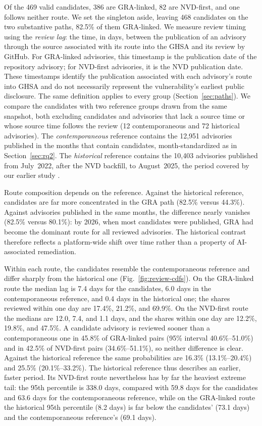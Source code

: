 \documentclass[smallextended,natbib]{svjour3}
\begin{document}
Of the 469 valid candidates, 386 are GRA-linked, 82 are NVD-first, and one follows neither route. We set the singleton aside, leaving 468 candidates on the two substantive paths, 82.5\% of them GRA-linked. We measure review timing using the \emph{review lag}: the time, in days, between the publication of an advisory through the source associated with its route into the GHSA and its review by GitHub. For GRA-linked advisories, this timestamp is the publication date of the repository advisory; for NVD-first advisories, it is the NVD publication date. These timestamps identify the publication associated with each advisory's route into GHSA and do not necessarily represent the vulnerability's earliest public disclosure. The same definition applies to every group (Section~\ref{sec:paths}).   We compare the candidates
with two reference groups drawn from the same snapshot, both excluding
candidates and advisories that lack a source time or whose source time follows
the review (12 contemporaneous and 72 historical advisories).  The
\emph{contemporaneous} reference contains the 12{,}951 advisories published in
the months that contain candidates, month-standardized as in
Section~\ref{sec:rq2}.  The \emph{historical} reference contains the 10{,}403
advisories published from July~2022, after the NVD backfill, to August~2025,
the period covered by our earlier study \citep{segal2026ghsa}.

Route composition depends on the reference.  Against the historical
reference, candidates are far more concentrated in the GRA path (82.5\% versus
44.3\%).  Against advisories published in the same months, the difference
nearly vanishes (82.5\% versus 80.1\%): by 2026, when most candidates were
published, GRA had become the dominant route for all reviewed advisories.  The
historical contrast therefore reflects a platform-wide shift over time rather
than a property of AI-associated remediation.

Within each route, the candidates resemble the contemporaneous reference and
differ sharply from the historical one (Fig.~\ref{fig:review-cdfs}).  On the
GRA-linked route the median lag is 7.4 days for the candidates, 6.0 days in the
contemporaneous reference, and 0.4 days in the historical one; the shares
reviewed within one day are 17.4\%, 21.2\%, and 69.9\%.  On the NVD-first route
the medians are 12.0, 7.4, and 1.1 days, and the shares within one day are
12.2\%, 19.8\%, and 47.5\%.  A candidate advisory is reviewed sooner than a
contemporaneous one in 45.8\% of GRA-linked pairs (95\% interval
40.6\%--51.0\%) and in 42.5\% of NVD-first pairs (34.6\%--51.1\%), so neither
difference is clear.  Against the historical reference the same probabilities
are 16.3\% (13.1\%--20.4\%) and 25.5\% (20.1\%--33.2\%).  The historical
reference thus describes an earlier, faster period.  Its NVD-first route
nevertheless has by far the heaviest extreme tail: the 95th percentile is
338.0 days, compared with 59.8 days for the candidates and 63.6 days for the
contemporaneous reference, while on the GRA-linked route the historical 95th
percentile (8.2 days) is far below the candidates' (73.1 days) and the
contemporaneous reference's (69.1 days).
\end{document}
